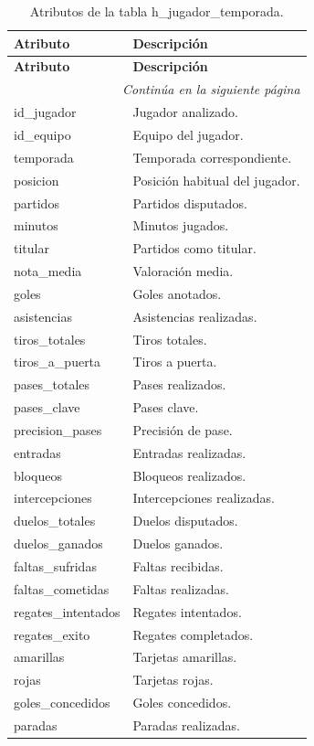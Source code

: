 \begin{longtable}{|l|l|}
\caption{Atributos de la tabla h\_jugador\_temporada.} \\

\hline
\textbf{Atributo} & \textbf{Descripción} \\
\hline
\endfirsthead

\hline
\textbf{Atributo} & \textbf{Descripción} \\
\hline
\endhead

\hline
\multicolumn{2}{r}{\textit{Continúa en la siguiente página}} \\
\hline
\endfoot

\hline
\endlastfoot

id\_jugador & Jugador analizado. \\
id\_equipo & Equipo del jugador. \\
temporada & Temporada correspondiente. \\
posicion & Posición habitual del jugador. \\
partidos & Partidos disputados. \\
minutos & Minutos jugados. \\
titular & Partidos como titular. \\
nota\_media & Valoración media. \\
goles & Goles anotados. \\
asistencias & Asistencias realizadas. \\
tiros\_totales & Tiros totales. \\
tiros\_a\_puerta & Tiros a puerta. \\
pases\_totales & Pases realizados. \\
pases\_clave & Pases clave. \\
precision\_pases & Precisión de pase. \\
entradas & Entradas realizadas. \\
bloqueos & Bloqueos realizados. \\
intercepciones & Intercepciones realizadas. \\
duelos\_totales & Duelos disputados. \\
duelos\_ganados & Duelos ganados. \\
faltas\_sufridas & Faltas recibidas. \\
faltas\_cometidas & Faltas realizadas. \\
regates\_intentados & Regates intentados. \\
regates\_exito & Regates completados. \\
amarillas & Tarjetas amarillas. \\
rojas & Tarjetas rojas. \\
goles\_concedidos & Goles concedidos. \\
paradas & Paradas realizadas. \\
\hline

\end{longtable}

